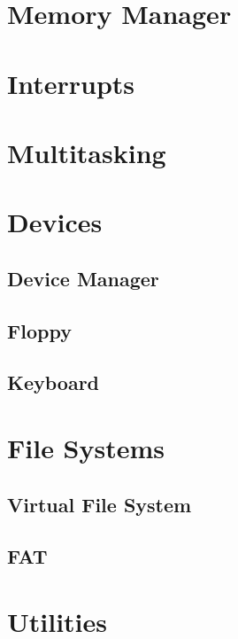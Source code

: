 \documentclass{article}
\begin{document}
\section{Memory Manager}


\section{Interrupts}


\section{Multitasking}



\section{Devices}
\subsection{Device Manager}

\subsection{Floppy}

\subsection{Keyboard}


\section{File Systems}
\subsection{Virtual File System}

\subsection{FAT}


\section{Utilities}



\end{document}
